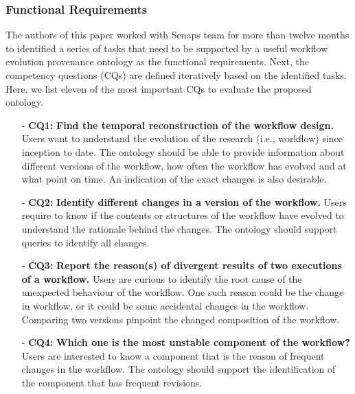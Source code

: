 \documentclass[ao]{iosart2x}
\begin{document}
\subsubsection{Functional Requirements}
\label{subsubsection:CQ}
The authors of this paper worked with Senaps team for more than twelve months to identified a series of tasks that need to be supported by a useful workflow evolution provenance ontology as the functional requirements. Next, the competency questions (CQs) are defined iteratively based on the identified tasks. %
Here, we list eleven of the most important CQs to evaluate the proposed ontology.
\begin{enumerate}
    \item[-]\textbf{CQ1:} \textbf{Find the temporal reconstruction of the workflow design.} Users want to understand the evolution of the research (i.e., workflow) since inception to date. The ontology should be able to provide information about different versions of the workflow, how often the workflow has evolved and at what point on time. An indication of the exact changes is also desirable. 
    \item[-]\textbf{CQ2:} \textbf{Identify different changes in a version of the workflow.} Users require to know if the contents or structures of the workflow have evolved to understand the rationale behind the changes. The ontology should support queries to identify all changes. 
    \item[-]\textbf{CQ3:} \textbf{Report the reason(s) of divergent results of two executions of a workflow.} Users are curious to identify the root cause of the unexpected behaviour of the workflow. One such reason could be the change in workflow, or it could be some accidental changes in the workflow. Comparing two versions pinpoint the changed composition of the workflow.
    \item[-]\textbf{CQ4:} \textbf{Which one is the most unstable component of the workflow?} Users are interested to know a component that is the reason of frequent changes in the workflow. The ontology should support the identification of the component that has frequent revisions.

\end{enumerate}
\end{document}
